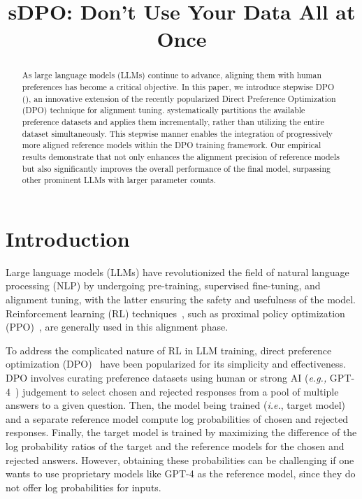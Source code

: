 \title{sDPO: Don't Use Your Data All at Once}



\maketitle
\begin{abstract}
As large language models (LLMs) continue to advance, aligning them with human preferences has become a critical objective. In this paper, we introduce stepwise DPO (\method), an innovative extension of the recently popularized Direct Preference Optimization (DPO) technique for alignment tuning. \method systematically partitions the available preference datasets and applies them incrementally, rather than utilizing the entire dataset simultaneously. This stepwise manner enables the integration of progressively more aligned reference models within the DPO training framework. Our empirical results demonstrate that \method not only enhances the alignment precision of reference models but also significantly improves the overall performance of the final model, surpassing other prominent LLMs with larger parameter counts.
\end{abstract}

\section{Introduction}
Large language models (LLMs) have revolutionized the field of natural language processing (NLP) by undergoing pre-training, supervised fine-tuning, and alignment tuning, with the latter ensuring the safety and usefulness of the model. 
Reinforcement learning (RL) techniques~\cite{christiano2017deep, bai2022constitutional}, such as proximal policy optimization (PPO)~\cite{schulman2017proximal}, are generally used in this alignment phase.

To address the complicated nature of RL in LLM training, direct preference optimization (DPO)~\cite{rafailov2023direct} have been popularized for its simplicity and effectiveness. DPO involves curating preference datasets using human or strong AI (\textit{e.g.,} GPT-4~\cite{openai2023gpt4}) judgement to select chosen and rejected responses from a pool of multiple answers to a given question. Then, the model being trained (\textit{i.e.}, target model) and a separate reference model compute log probabilities of chosen and rejected responses. Finally, the target model is trained by maximizing the difference of the log probability ratios of the target and the reference models for the chosen and rejected answers. However, obtaining these probabilities can be challenging if one wants to use proprietary models like GPT-4 as the reference model, since they do not offer log probabilities for inputs.

